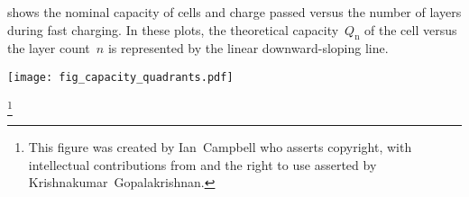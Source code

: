  shows the nominal  capacity of cells and charge
passed versus  the number of  layers during fast  charging. In these  plots, the
theoretical  capacity~$Q_\text{n}$ of  the cell  versus the  layer count~$n$  is
represented by the linear downward-sloping line.
\begin{figure*}[p]
    \begin{minipage}[t]{\textwidth}
        \centering \texttt{[image: fig\_capacity\_quadrants.pdf]}
        \captionsetup{labelsep=note}
        \caption[
        Nominal capacity and charge passed versus layer count for ---
        \emph{a}) constant current  charging and \emph{b}) constant power  charging
        ]
        {
            The plots in the right column show the nominal cell capacity and charge passed
            during \gls{xeV} \gls{cp} charging. Increased rate capability and cell utilisation are positively
            correlated with $n$, while the maximum-$q$ layer configuration clearly shifts to higher
            values of $n$ with increasing charging powers. The plots in the left column depict
            galvanostatic charging scenarios at various currents to highlight the similarity with the
            \gls{cp} process. All data obtained at $T_\text{init} =$ \SI{25}{\degreeCelsius},
            $T_\text{sink} =$ \SI{25}{\degreeCelsius}.
        }
        \label{fig:fig_CapacityQuadrants}
        \mpfootnotes[1]
        \footnote{This figure was created by \mbox{Ian Campbell} who asserts copyright,
            with intellectual contributions from and the right to use asserted by
        \mbox{Krishnakumar Gopalakrishnan}.}
    \end{minipage}
\end{figure*}

